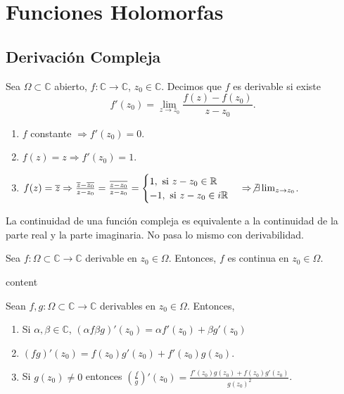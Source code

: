 \chapter{Funciones Holomorfas}
\section{Derivación Compleja}

\begin{defn}[Derivada]
  Sea $\Omega \subset \mathbb{C}$ abierto, $ f: \mathbb{C} \to \mathbb{C}$, $z_{0} \in \mathbb{C}$. Decimos que $f$ es derivable si existe 
  \[ 
     f'(z_{0}) = \lim_{z \to z_{0}} \frac{f(z) - f(z_{0})}{z - z_{0}}. 
  \] 
\end{defn}

\begin{ejm}
  \begin{enumerate}[label=(\roman*)]
    \item $f$ constante $\Rightarrow f'(z_{0}) = 0$.
    \item $f(z) = z \Rightarrow f'(z_{0}) = 1$.
    \item $f(z) = \overline{z} \Rightarrow \frac{\overline{z} - \overline{z_{0}}}{z - z_{0}} = \frac{\overline{z - z_{0}}}{z - z_{0}} =
    \begin{cases}
      1, \text{ si } z - z_{0} \in \mathbb{R} \\
      -1, \text{ si } z - z_{0} \in i \mathbb{R}
    \end{cases}
    \Rightarrow \not \exists \lim_{z \to z_{0}}$.
  \end{enumerate}
\end{ejm}

\begin{obs}
  La continuidad de una función compleja es equivalente a la continuidad de la parte real y la parte imaginaria. No pasa lo mismo con derivabilidad.
\end{obs}

\begin{prop}
  Sea $f: \Omega \subset \mathbb{C} \to \mathbb{C}$ derivable en $z_{0} \in \Omega$. Entonces, $f$ es continua en $z_{0} \in \Omega$.
\end{prop}

\begin{dem}
  content
\end{dem}

\begin{prop}
  Sean $f,g: \Omega \subset \mathbb{C} \to \mathbb{C}$ derivables en $z_{0} \in \Omega$. Entonces, 
  \begin{enumerate}[label=(\roman*)]
    \item Si $\alpha, \beta \in \mathbb{C}$, $(\alpha f \beta g)'(z_{0}) = \alpha f'(z_{0}) + \beta g'(z_{0})$
    \item $(fg)'(z_{0}) = f(z_{0})g'(z_{0}) + f'(z_{0})g(z_{0})$.
    \item Si $ g(z_{0}) \neq 0$ entonces $(\frac{f}{g})'(z_{0}) = \frac{f'(z_{0})g(z_{0}) + f(z_{0})g'(z_{0})}{g(z_{0})^{2}}$.
  \end{enumerate}
\end{prop}

